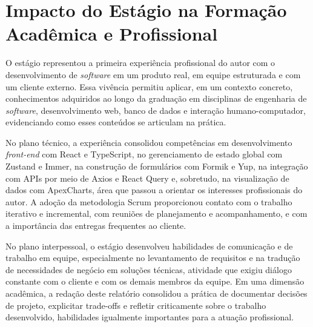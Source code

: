 \section{Impacto do Estágio na Formação Acadêmica e Profissional}

O estágio representou a primeira experiência profissional do autor com o desenvolvimento de \textit{software} em um produto real, em equipe estruturada e com um cliente externo. Essa vivência permitiu aplicar, em um contexto concreto, conhecimentos adquiridos ao longo da graduação em disciplinas de engenharia de \textit{software}, desenvolvimento web, banco de dados e interação humano-computador, evidenciando como esses conteúdos se articulam na prática.

No plano técnico, a experiência consolidou competências em desenvolvimento \textit{front-end} com React e TypeScript, no gerenciamento de estado global com Zustand e Immer, na construção de formulários com Formik e Yup, na integração com APIs por meio de Axios e React Query e, sobretudo, na visualização de dados com ApexCharts, área que passou a orientar os interesses profissionais do autor. A adoção da metodologia Scrum proporcionou contato com o trabalho iterativo e incremental, com reuniões de planejamento e acompanhamento, e com a importância das entregas frequentes ao cliente.

No plano interpessoal, o estágio desenvolveu habilidades de comunicação e de trabalho em equipe, especialmente no levantamento de requisitos e na tradução de necessidades de negócio em soluções técnicas, atividade que exigiu diálogo constante com o cliente e com os demais membros da equipe. Em uma dimensão acadêmica, a redação deste relatório consolidou a prática de documentar decisões de projeto, explicitar trade-offs e refletir criticamente sobre o trabalho desenvolvido, habilidades igualmente importantes para a atuação profissional.


